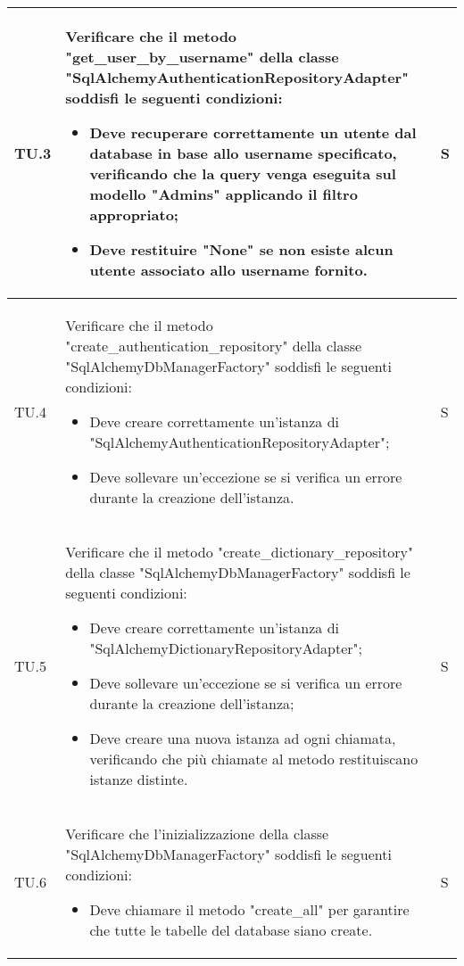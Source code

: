 \begin{adjustwidth}{-0.5cm}{-0.5cm}
\begin{longtable}{|P{1.5cm}|>{\raggedright}P{9.5cm}|>{\arraybackslash}P{1.5cm}|}
		\hline TU.3 & Verificare che il metodo "get\_user\_by\_username" della classe "SqlAlchemyAuthenticationRepositoryAdapter" soddisfi le seguenti condizioni:
		\begin{itemize}
			\item Deve recuperare correttamente un utente dal database in base allo username specificato, verificando che la query venga eseguita sul modello "Admins" applicando il filtro appropriato;
			\item Deve restituire "None" se non esiste alcun utente associato allo username fornito.
		\end{itemize} & S \\

		\hline TU.4 & Verificare che il metodo "create\_authentication\_repository" della classe "SqlAlchemyDbManagerFactory" soddisfi le seguenti condizioni:
		\begin{itemize}
			\item Deve creare correttamente un'istanza di "SqlAlchemyAuthenticationRepositoryAdapter";
			\item Deve sollevare un'eccezione se si verifica un errore durante la creazione dell'istanza.
		\end{itemize} & S \\

		\hline TU.5 & Verificare che il metodo "create\_dictionary\_repository" della classe "SqlAlchemyDbManagerFactory" soddisfi le seguenti condizioni:
		\begin{itemize}
			\item Deve creare correttamente un'istanza di "SqlAlchemyDictionaryRepositoryAdapter";
			\item Deve sollevare un'eccezione se si verifica un errore durante la creazione dell'istanza;
			\item Deve creare una nuova istanza ad ogni chiamata, verificando che più chiamate al metodo restituiscano istanze distinte.
		\end{itemize} & S \\

		\hline TU.6 & Verificare che l'inizializzazione della classe "SqlAlchemyDbManagerFactory" soddisfi le seguenti condizioni:
		\begin{itemize}
			\item Deve chiamare il metodo "create\_all" per garantire che tutte le tabelle del database siano create.
		\end{itemize} & S \\


\end{longtable}
\end{adjustwidth}
